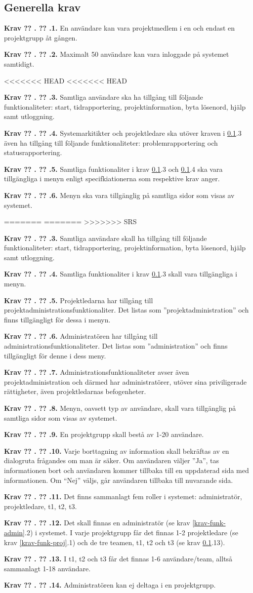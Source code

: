 \documentclass[a4paper]{article}
\newcommand\getcurrentref[1]{%
 \ifnumequal{\value{#1}}{0}
  {??}
  {\the\value{#1}}%
}
\newcommand\requirement[2]{
	\numberedrow{Krav}{#1}{#2}
}
\newcommand\numberedrow[3]{
	\noindent
	\textbf{#1 \getcurrentref{section}.\getcurrentref{subsection}.#2.} #3
	
}
\begin{document}
\subsection{Generella krav}
\label{krav-funk-gen}

\requirement{1}{En användare kan vara projektmedlem i en och endast en projektgrupp åt gången.}
\requirement{2}{Maximalt 50 användare kan vara inloggade på systemet samtidigt.}
<<<<<<< HEAD
<<<<<<< HEAD
\requirement{3}{Samtliga användare ska ha tillgång till följande funktionaliteter: start, tidrapportering, projektinformation, byta lösenord, hjälp samt utloggning.}
\requirement{4}{Systemarkitikter och projektledare ska utöver kraven i \ref{krav-funk-gen}.3 även ha tillgång till följande funktionaliteter: problemrapportering och statusrapportering.}
\requirement{5}{Samtliga funktionaliter i krav \ref{krav-funk-gen}.3 och \ref{krav-funk-gen}.4 ska vara tillgängliga i menyn enligt specifkiationerna som respektive krav anger.}
\requirement{6}{Menyn ska vara tillgänglig på samtliga sidor som visas av systemet.}
 
=======
=======
>>>>>>> SRS
\requirement{3}{Samtliga användare skall ha tillgång till följande funktionaliteter: start, tidrapportering, projektinformation, byta lösenord, hjälp samt utloggning.}
\requirement{4}{Samtliga funktionaliter i krav \ref{krav-funk-gen}.3 skall vara tillgängliga i menyn.}
\requirement{5}{Projektledarna har tillgång till projektadministrationsfunktionaliter. Det listas som ''projektadministration'' och finns tillgängligt för dessa i menyn.}
\requirement{6}{Administratören har tillgång till administrationsfunktionaliteter. Det listas som ''administration'' och finns tillgängligt för denne i dess meny.}
\requirement{7}{Administrationsfunktionaliteter avser även projektadministration och därmed har administratörer, utöver sina priviligerade rättigheter, även projektledarnas befogenheter.}
\requirement{8}{Menyn, oavsett typ av användare, skall vara tillgänglig på samtliga sidor som visas av systemet.}
\requirement{9}{En projektgrupp skall bestå av 1-20 användare.}
\requirement{10}{Varje borttagning av information skall bekräftas av en dialogruta frågandes om man är säker. Om användaren väljer ''Ja'', tas informationen bort och användaren kommer tillbaka till en uppdaterad sida med informationen. Om ``Nej'' väljs, går användaren tillbaka till nuvarande sida.}
\requirement{11}{Det finns sammanlagt fem roller i systemet: administratör, projektledare, t1, t2, t3.}
\requirement{12}{Det skall finnas en administratör (se krav \ref{krav-funk-admin}.2) i systemet. I varje projektgrupp får det finnas 1-2 projektledare (se krav \ref{krav-funk-proj}.1) och de tre teamen, t1, t2 och t3 (se krav \ref{krav-funk-gen}.13).}
\requirement{13}{I t1, t2 och t3 får det finnas 1-6 användare/team, alltså sammanlagt 1-18 användare.}
\requirement{14}{Administratören kan ej deltaga i en projektgrupp.}
\end{document}
